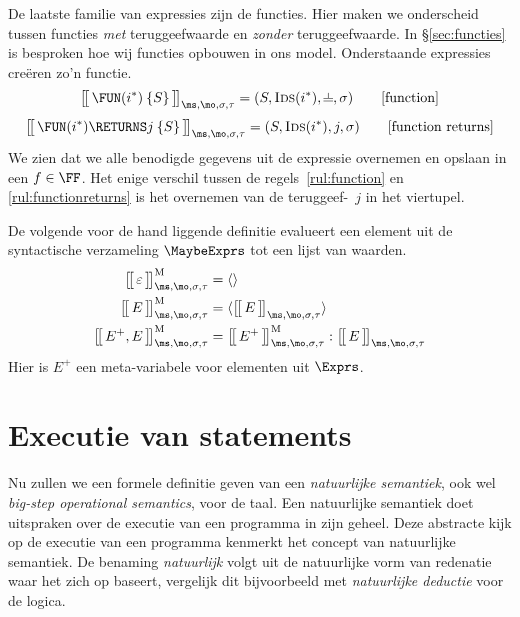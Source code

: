 De laatste familie van expressies zijn de functies. Hier maken we onderscheid tussen functies \emph{met} teruggeefwaarde en \emph{zonder} teruggeefwaarde. In §\ref{sec:functies} is besproken hoe wij functies opbouwen in ons model. Onderstaande expressies creëren zo'n functie.
%
\begin{equation}
  \Express{\FUN (i^*) \: \{S\}}{\ms,\mo,\sigma,\tau} = (S, \textsc{Ids}(i^*), \nil, \sigma)
  \tag*{[function]}\label{rul:function}
\end{equation}
%
\begin{equation}
  \Express{\FUN (i^*) \RETURNS j \: \{S\}}{\ms,\mo,\sigma,\tau} = (S, \textsc{Ids}(i^*), j, \sigma)
  \tag*{[function returns]}\label{rul:functionreturns}
\end{equation}
%
We zien dat we alle benodigde gegevens uit de expressie overnemen en opslaan in een $f\in\FF$. Het enige verschil tussen de regels~\ref{rul:function} en \ref{rul:functionreturns} is het overnemen van de teruggeef-\Id\ $j$ in het viertupel.

De volgende voor de hand liggende definitie evalueert een element uit de syntactische verzameling $\MaybeExprs$ tot een lijst van waarden.
%
\begin{align*}
  \Express[M]{\varepsilon}{\ms,\mo,\sigma,\tau} &= \langle\rangle \\
  \Express[M]{E}{\ms,\mo,\sigma,\tau} &= \langle \Express{E}{\ms,\mo,\sigma,\tau} \rangle \\
  \Express[M]{E^+, E}{\ms,\mo,\sigma,\tau} &= \Express[M]{E^+}{\ms,\mo,\sigma,\tau} : \Express{E}{\ms,\mo,\sigma,\tau}
\end{align*}
%
Hier is $E^+$ een meta-variabele voor elementen uit $\Exprs$.

\section{Executie van statements}

Nu zullen we een formele definitie geven van een \emph{natuurlijke semantiek}, ook wel \emph{big-step operational semantics}, voor de taal. Een natuurlijke semantiek doet uitspraken over de executie van een programma in zijn geheel. Deze abstracte kijk op de executie van een programma kenmerkt het concept van natuurlijke semantiek. De benaming \emph{natuurlijk} volgt uit de natuurlijke vorm van redenatie waar het zich op baseert, vergelijk dit bijvoorbeeld met \emph{natuurlijke deductie} voor de logica.

